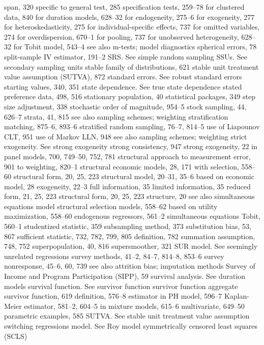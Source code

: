 span, 320
specific to general test, 285 specification tests, 259–78
for clustered data, 840
for duration models, 628–32
for endogeneity, 275–6
for exogeneity, 277
for heteroskedasticity, 275
for individual-specific effects, 737 for omitted variables, 274
for overdispersion, 670–1
for pooling, 737
for unobserved heterogeneity, 628–32 for Tobit model, 543–4
see also m-tests; model diagnostics
spherical errors, 78
split-sample IV estimator, 191–2
SRS. See simple random sampling
SSUs. See secondary sampling units
stable family of distributions, 621
stable unit treatment value assumption (SUTVA), 872 standard errors. See robust standard errors
starting values, 340, 351
state dependence. See true state dependence stated preference data, 498, 516
stationary population, 40
statistical packages, 349
step size adjustment, 338
stochastic order of magnitude, 954–5
stock sampling, 44, 626–7
strata, 41, 815
see also sampling schemes; weighting stratification matching, 875–6, 893–6 stratified random sampling, 76–7, 814–5
use of Liapounov CLT, 951
use of Markov LLN, 948
see also sampling schemes; weighting
strict exogeneity. See strong exogeneity strong consistency, 947
strong exogeneity, 22
in panel models, 700, 749–50, 752, 781 structural approach
to measurement error, 901
to weighting, 820–1
structural economic models, 28, 171
with selection, 558–60 structural form, 20, 25, 223 structural model, 20–31, 35–6
based on economic model, 28 exogeneity, 22–3
full information, 35
limited information, 35 reduced form, 21, 25, 223 structural form, 20, 25, 223 structure, 20
see also simultaneous equations model structural selection models, 558–62
based on utility maximization, 558–60 endogenous regressors, 561–2 simultaneous equations Tobit, 560–1
studentized statistic, 359 subsampling method, 373 substitution bias, 53, 867
sufficient statistic, 732, 782, 799, 805
definition, 782
summation assumption, 748, 752 superpopulation, 40, 816
supersmoother, 321
SUR model. See seemingly unrelated regressions survey methods, 41–2, 84–7, 814–8, 853–6 survey nonresponse, 45–6, 60, 739
see also attrition bias; imputation methods
Survey of Income and Program Participation (SIPP),
59
survival analysis. See duration models survival function. See survivor function survivor function
aggregate survivor function, 619 definition, 576–8
estimator in PH model, 596–7
Kaplan-Meier estimator, 581–2, 604–5 in mixture models, 615–6 multivariate, 649–50
parametric examples, 585
SUTVA. See stable unit treatment value assumption switching regressions model. See Roy model symmetrically censored least squares (SCLS)
